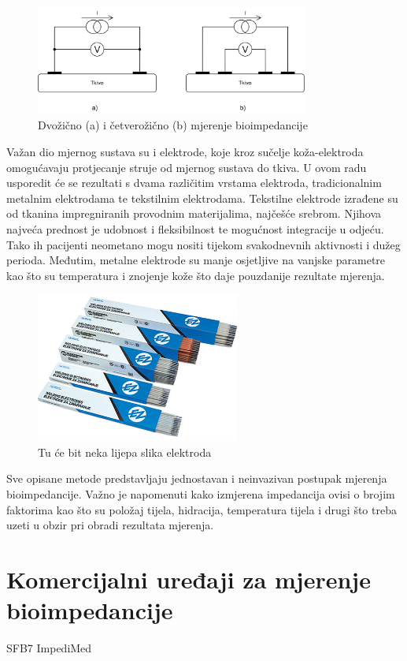 \documentclass[../diplomski_rad.tex]{subfiles}
\begin{document}
\begin{figure}[htb]
    \centering
    \includegraphics[width=0.8\textwidth]{Figures/dvo_vs_cetverozicno.png} 
    \caption{Dvožično (a) i četverožično (b) mjerenje bioimpedancije}
    \label{slk:cole_model}
\end{figure}

Važan dio mjernog sustava su i elektrode, koje kroz sučelje koža-elektroda omogućavaju protjecanje struje od mjernog sustava do tkiva. 
U ovom radu usporedit će se rezultati s dvama različitim vrstama elektroda, tradicionalnim metalnim elektrodama te tekstilnim elektrodama. 
Tekstilne elektrode izrađene su od tkanina impregniranih provodnim materijalima, najčešće srebrom. 
Njihova najveća prednost je udobnost i fleksibilnost te mogućnost integracije u odjeću.
Tako ih pacijenti neometano mogu nositi tijekom svakodnevnih aktivnosti i dužeg perioda. 
Međutim, metalne elektrode su manje osjetljive na vanjske parametre kao što su temperatura i znojenje kože što daje pouzdanije rezultate mjerenja. 
\cite{Meding2021}

\begin{figure}[htb]
    \centering
    \includegraphics[width=0.6\textwidth]{Figures/electrode.jpg} 
    \caption{Tu će bit neka lijepa slika elektroda}
    \label{slk:elektrode}
\end{figure}

Sve opisane metode predstavljaju jednostavan i neinvazivan postupak mjerenja bioimpedancije. 
Važno je napomenuti kako izmjerena impedancija ovisi o brojim faktorima kao što su položaj tijela, hidracija, temperatura tijela i drugi 
što treba uzeti u obzir pri obradi rezultata mjerenja.

\section{Komercijalni uređaji za mjerenje bioimpedancije}

SFB7 ImpediMed
\end{document}
